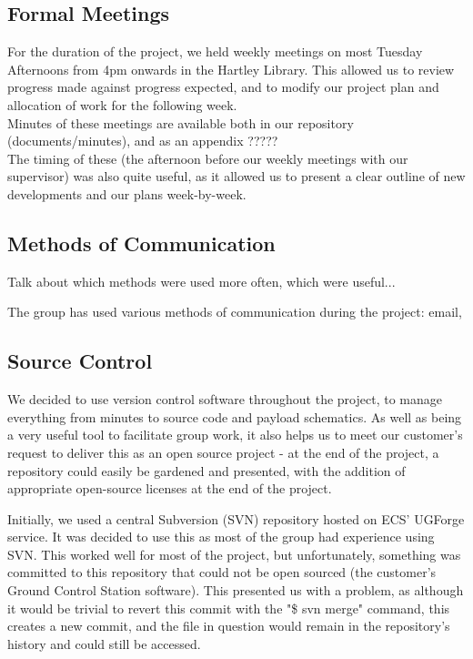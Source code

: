 \subsection{Formal Meetings}
\label{formal meetings}
For the duration of the project, we held weekly meetings on most Tuesday 
Afternoons from 4pm onwards in the Hartley Library. This allowed us to 
review progress made against progress expected, and to modify our project 
plan and allocation of work for the following week.
\\
Minutes of these meetings are available both in our repository \cite{github} 
(documents/minutes), and as an appendix ?????
\\
The timing of these (the afternoon before our weekly meetings with our 
supervisor) was also quite useful, as it allowed us to present a clear outline 
of new developments and our plans week-by-week.

\subsection{Methods of Communication}
Talk about which methods were used more often, which were useful...

The group has used various methods of communication during the project: 
email, 

\subsection{Source Control}
\label{source control}
We decided to use version control software throughout the project, to manage 
everything from minutes to source code and payload schematics. As well as 
being a very useful tool to facilitate group work, it also helps us to meet 
our customer's request to deliver this as an open source project - at the end 
of the project, a repository could easily be gardened and presented, with the 
addition of appropriate open-source licenses at the end of the project.

Initially, we used a central Subversion (SVN) repository hosted on ECS' 
UGForge service. It was decided to use this as most of the group had 
experience using SVN. This worked well for most of the project, but 
unfortunately, something was committed to this repository that could not be 
open sourced (the customer's Ground Control Station software). This presented 
us with a problem, as although it would be trivial to revert this commit with 
the "\$ svn merge" command, this creates a new commit, and the file in 
question would remain in the repository's history and could still be accessed.

